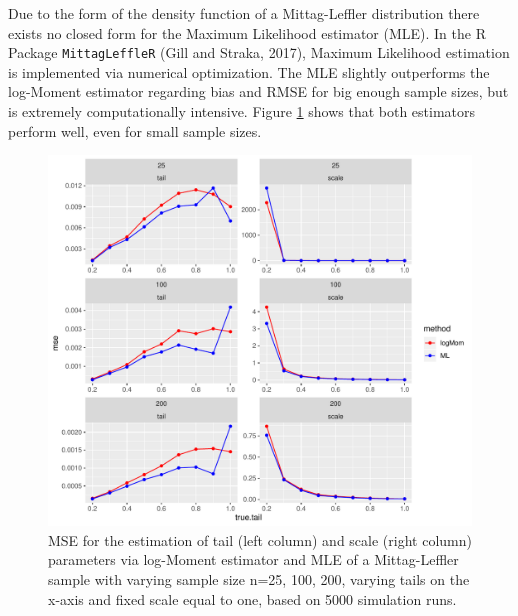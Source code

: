 \documentclass[]{elsarticle} %
\begin{document}
Due to the form of the density function of a Mittag-Leffler distribution
there exists no closed form for the Maximum Likelihood estimator (MLE).
In the R Package \texttt{MittagLeffleR} (Gill and Straka, 2017), Maximum
Likelihood estimation is implemented via numerical optimization. The MLE
slightly outperforms the log-Moment estimator regarding bias and RMSE
for big enough sample sizes, but is extremely computationally intensive.
Figure \ref{fig:MSE} shows that both estimators perform well, even for
small sample sizes.

\begin{figure}

{\centering \includegraphics[width=0.9\linewidth]{article_springer_files/figure-latex/MSE-1} 

}

\caption{\label{fig:MSE} MSE for the estimation of tail (left column) and scale (right column) parameters via log-Moment estimator and MLE of a Mittag-Leffler sample with varying sample size n=25, 100, 200, varying tails on the x-axis and fixed scale equal to one, based on 5000 simulation runs.}\label{fig:MSE}
\end{figure}
\end{document}
